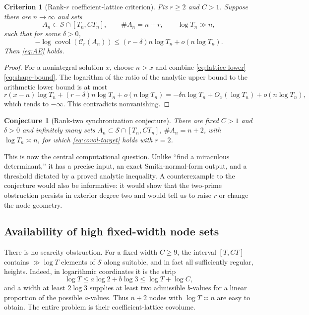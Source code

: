 \documentclass[11pt]{article}
\newtheorem{conjecture}[theorem]{Conjecture}
\newtheorem{criterion}[theorem]{Criterion}
\theoremstyle{definition}
\theoremstyle{remark}
\newcommand{\covol}{\operatorname{covol}}
\newcommand{\calS}{\mathcal S}
\newcommand{\calC}{\mathcal C}
\begin{document}
\begin{criterion}[Rank-$r$ coefficient-lattice criterion]\label{crit:rank-r}
Fix $r\ge2$ and $C>1$.  Suppose there are $n\to\infty$ and sets
\[
 A_n\subset\calS\cap[T_n,CT_n],\qquad \#A_n=n+r,
 \qquad \log T_n\gg n,
\]
such that for some $\delta>0$,
\begin{equation}\label{eq:covol-target}
  -\log\covol(\calC_r(A_n))
  \le (r-\delta)n\log T_n+o(n\log T_n).
\end{equation}
Then \eqref{eq:AE} holds.
\end{criterion}
\begin{proof}
For a nonintegral solution $x$, choose $n>x$ and combine
\eqref{eq:lattice-lower}--\eqref{eq:shape-bound}.  The logarithm of the ratio of the analytic upper bound to the arithmetic lower bound is at most
\[
  r(x-n)\log T_n+(r-\delta)n\log T_n+o(n\log T_n)
  =-\delta n\log T_n+O_x(\log T_n)+o(n\log T_n),
\]
which tends to $-\infty$.  This contradicts nonvanishing.
\end{proof}

\begin{conjecture}[Rank-two synchronization conjecture]\label{conj:rank-two}
There are fixed $C>1$ and $\delta>0$ and infinitely many sets
$A_n\subset\calS\cap[T_n,CT_n]$, $\#A_n=n+2$, with $\log T_n\asymp n$, for which \eqref{eq:covol-target} holds with $r=2$.
\end{conjecture}

This is now the central computational question.  Unlike ``find a miraculous determinant,'' it has a precise input, an exact Smith-normal-form output, and a threshold dictated by a proved analytic inequality.  A counterexample to the conjecture would also be informative: it would show that the two-prime obstruction persists in exterior degree two and would tell us to raise $r$ or change the node geometry.

\subsection{Availability of high fixed-width node sets}
There is no scarcity obstruction.  For a fixed width $C\ge9$, the interval $[T,CT]$ contains $\gg\log T$ elements of $\calS$ along suitable, and in fact all sufficiently regular, heights.  Indeed, in logarithmic coordinates it is the strip
\[
  \log T\le a\log2+b\log3\le\log T+\log C,
\]
and a width at least $2\log3$ supplies at least two admissible $b$-values for a linear proportion of the possible $a$-values.  Thus $n+2$ nodes with $\log T\asymp n$ are easy to obtain.  The entire problem is their coefficient-lattice covolume.
\end{document}
